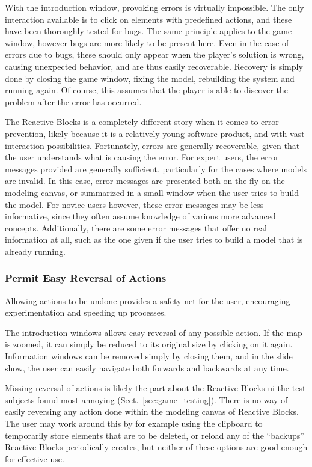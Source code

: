 \noindent
With the introduction window, provoking errors is virtually impossible. The only interaction available is to click on elements with predefined actions, and these have been thoroughly tested for bugs. The same principle applies to the game window, however bugs are more likely to be present here. Even in the case of errors due to bugs, these should only appear when the player's solution is wrong, causing unexpected behavior, and are thus easily recoverable. Recovery is simply done by closing the game window, fixing the model, rebuilding the system and running again. Of course, this assumes that the player is able to discover the problem after the error has occurred.

\noindent
The Reactive Blocks is a completely different story when it comes to error prevention, likely because it is a relatively young software product, and with vast interaction possibilities. Fortunately, errors are generally recoverable, given that the user understands what is causing the error. For expert users, the error messages provided are generally sufficient, particularly for the cases where models are invalid. In this case, error messages are presented both on-the-fly on the modeling canvas, or summarized in a small window when the user tries to build the model. For novice users however, these error messages may be less informative, since they often assume knowledge of various more advanced concepts. Additionally, there are some error messages that offer no real information at all, such as the one given if the user tries to build a model that is already running.

\subsubsection{Permit Easy Reversal of Actions}
Allowing actions to be undone provides a safety net for the user, encouraging experimentation and speeding up processes.

\noindent
The introduction windows allows easy reversal of any possible action. If the map is zoomed, it can simply be reduced to its original size by clicking on it again. Information windows can be removed simply by closing them, and in the slide show, the user can easily navigate both forwards and backwards at any time.

\noindent
Missing reversal of actions is likely the part about the Reactive Blocks \gls{ui} the test subjects found most annoying (Sect.~\ref{sec:game_testing}). There is no way of easily reversing any action done within the modeling canvas of Reactive Blocks. The user may work around this by for example using the clipboard to temporarily store elements that are to be deleted, or reload any of the ``backups'' Reactive Blocks periodically creates, but neither of these options are good enough for effective use.

